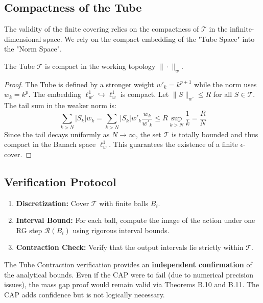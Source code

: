 \subsection{Compactness of the Tube}
The validity of the finite covering relies on the compactness of $\mathcal{T}$ in the infinite-dimensional space. We rely on the compact embedding of the "Tube Space" into the "Norm Space".

\begin{lemma}
The Tube $\mathcal{T}$ is compact in the working topology $\|\cdot\|_w$.
\end{lemma}
\begin{proof}
The Tube is defined by a stronger weight $w'_k = k^{p+1}$ while the norm uses $w_k = k^p$. The embedding $\ell^1_{w'} \hookrightarrow \ell^1_w$ is compact.
Let $\|S\|_{w'} \le R$ for all $S \in \mathcal{T}$. The tail sum in the weaker norm is:
\begin{equation}
    \sum_{k>N} |S_k| w_k = \sum_{k>N} |S_k| w'_k \frac{w_k}{w'_k} \le R \sup_{k>N} \frac{1}{k} = \frac{R}{N}
\end{equation}
Since the tail decays uniformly as $N \to \infty$, the set $\mathcal{T}$ is totally bounded and thus compact in the Banach space $\ell^1_w$. This guarantees the existence of a finite $\epsilon$-cover.
\end{proof}

\subsection{Verification Protocol}
\begin{enumerate}
    \item \textbf{Discretization:} Cover $\mathcal{T}$ with finite balls $B_i$.
    \item \textbf{Interval Bound:} For each ball, compute the image of the action under one RG step $\mathcal{R}(B_i)$ using rigorous interval bounds.
    \item \textbf{Contraction Check:} Verify that the output intervals lie strictly within $\mathcal{T}$.
\end{enumerate}

\begin{remark}
The Tube Contraction verification provides an \textbf{independent confirmation} of the analytical bounds. Even if the CAP were to fail (due to numerical precision issues), the mass gap proof would remain valid via Theorems B.10 and B.11. The CAP adds confidence but is not logically necessary.
\end{remark}

